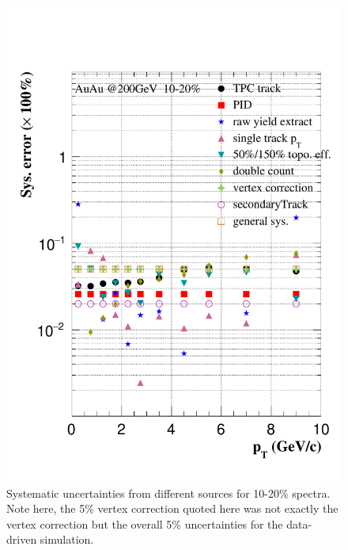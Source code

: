 \begin{figure}[htbp]
\begin{minipage}[htbp]{0.47\linewidth}
\includegraphics[width=1.0\textwidth,angle=0]{figure/Run14_D0HFT/sysErr_10_20_2.pdf} 
\caption{ Systematic uncertainties from different sources for 10-20\% spectra.  Note here, the 5\% vertex correction quoted here was not exactly the vertex correction but the overall 5\% uncertainties for the data-driven simulation.\label{sysErr_10_20}}
\end{minipage}
\end{figure}


